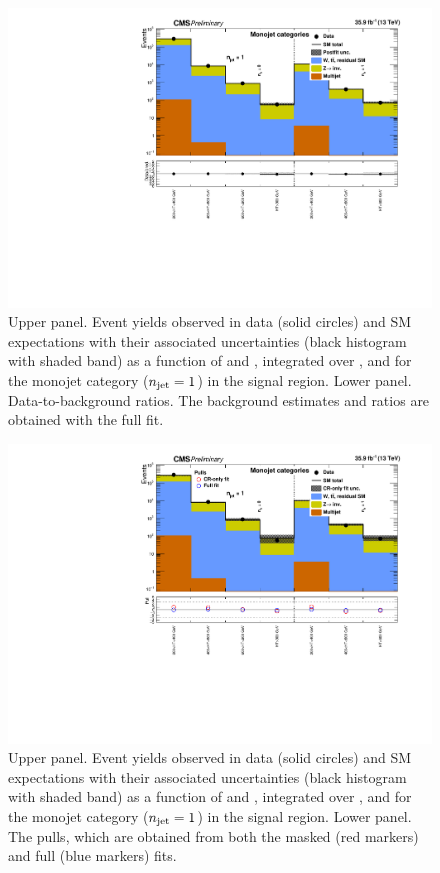 \clearpage
\begin{figure}[h!]
  \centering
  \caption{Upper panel. Event yields observed in data (solid circles)
    and SM expectations with their associated uncertainties (black
    histogram with shaded band) as a function of \nb and \scalht,
    integrated over \mht, and for the monojet category ($n_{\text{jet}} = 1$)
    in the signal region. Lower panel. Data-to-background ratios. The
    background estimates and ratios are obtained with the full fit. }
  \label{fig:mr_mono_post}
  \includegraphics[width=1.\linewidth]{figures/results/36invfb/mono/summaryPlot_Monojet_fit_b}
\end{figure}

\clearpage
\begin{figure}[h!]
  \centering
  \caption{Upper panel. Event yields observed in data (solid circles)
    and SM expectations with their associated uncertainties (black
    histogram with shaded band) as a function of \nb and \scalht,
    integrated over \mht, and for the monojet category ($n_{\text{jet}} = 1$)
    in the signal region. Lower panel. The pulls, which are obtained
    from both the masked (red markers) and full (blue markers) fits. }
  \label{fig:mr_mono_pulls}
  \includegraphics[width=1.\linewidth]{figures/results/36invfb/mono/summaryPlot_Monojet_prefit_overlay_fit_b}
\end{figure}

